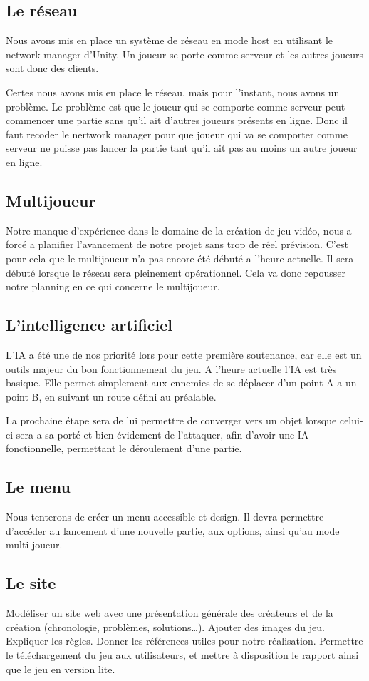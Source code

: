 \documentclass[a4paper, 12pt]{article}
\begin{document}
	\subsection{Le réseau}
Nous avons mis en place un système de réseau en mode host en utilisant le network manager d’Unity. Un joueur se porte comme serveur et les autres joueurs sont donc des clients.
\par Certes nous avons mis en place le réseau, mais pour l’instant, nous avons un problème. Le problème est que le joueur qui se comporte comme serveur peut commencer une partie sans qu’il ait d’autres joueurs présents en ligne. Donc il faut recoder le nertwork manager  pour que joueur qui va se comporter comme serveur ne puisse pas lancer la partie tant qu’il ait pas au moins un autre joueur en ligne.

	\subsection{Multijoueur}
	Notre manque d'expérience dans le domaine de la création de jeu vidéo, nous a forcé a planifier l'avancement de notre projet sans trop de réel prévision. C'est pour cela que le multijoueur n'a pas encore été débuté a l'heure actuelle. Il sera débuté lorsque le réseau sera pleinement opérationnel. Cela va donc repousser notre planning en ce qui concerne le multijoueur.
	\subsection{L'intelligence artificiel}
	L'IA a été une de nos priorité lors pour cette première soutenance, car elle est un outils majeur du bon fonctionnement du jeu. A l'heure actuelle l'IA est très basique. Elle permet simplement aux ennemies de se déplacer d'un point A a un point B, en suivant un route défini au préalable.
	\par La prochaine étape sera de lui permettre de converger vers un objet lorsque celui-ci sera a sa porté et bien évidement de l'attaquer, afin d'avoir une IA fonctionnelle, permettant le déroulement d'une partie.

	\subsection{Le menu}
	Nous tenterons de créer un menu accessible et design. Il devra permettre d'accéder au lancement d’une nouvelle partie, aux options, ainsi qu’au mode multi-joueur. 
	\subsection{Le site}
	Modéliser un site web avec une présentation générale des créateurs et de la création (chronologie, problèmes, solutions…). Ajouter des images du jeu. Expliquer les règles.  Donner les références utiles pour notre réalisation. Permettre le téléchargement du jeu aux utilisateurs, et mettre à disposition le rapport ainsi que le jeu en version lite.
\end{document}
